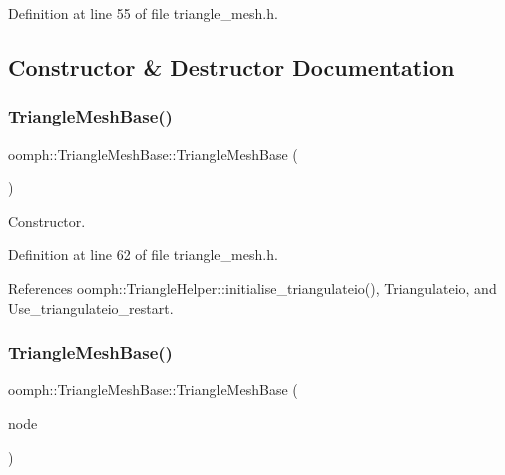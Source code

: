 Definition at line 55 of file triangle\+\_\+mesh.\+h.



\subsection{Constructor \& Destructor Documentation}
\mbox{\label{classoomph_1_1TriangleMeshBase_afdfa2e68988d225301a9a262883ddf62}} 
\subsubsection{\texorpdfstring{Triangle\+Mesh\+Base()}{TriangleMeshBase()}\hspace{0.1cm}{\footnotesize\ttfamily [1/2]}}
{\footnotesize\ttfamily oomph\+::\+Triangle\+Mesh\+Base\+::\+Triangle\+Mesh\+Base (\begin{DoxyParamCaption}{ }\end{DoxyParamCaption})\hspace{0.3cm}{\ttfamily [inline]}}



Constructor. 



Definition at line 62 of file triangle\+\_\+mesh.\+h.



References oomph\+::\+Triangle\+Helper\+::initialise\+\_\+triangulateio(), Triangulateio, and Use\+\_\+triangulateio\+\_\+restart.

\mbox{\label{classoomph_1_1TriangleMeshBase_a598613709db807336487fbe2657e905e}} 
\subsubsection{\texorpdfstring{Triangle\+Mesh\+Base()}{TriangleMeshBase()}\hspace{0.1cm}{\footnotesize\ttfamily [2/2]}}
{\footnotesize\ttfamily oomph\+::\+Triangle\+Mesh\+Base\+::\+Triangle\+Mesh\+Base (\begin{DoxyParamCaption}\item[{const \hyperlink{classoomph_1_1TriangleMeshBase}{Triangle\+Mesh\+Base} \&}]{node }\end{DoxyParamCaption})\hspace{0.3cm}{\ttfamily [inline]}}



